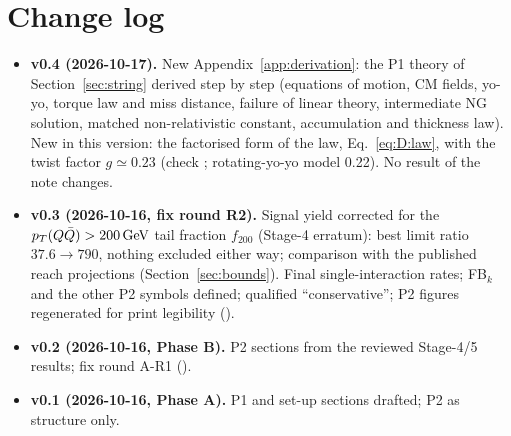 \section*{Change log}
\begin{itemize}
\item \textbf{v0.4 (2026-10-17).} New Appendix~\ref{app:derivation}: the P1 theory of Section~\ref{sec:string}
  derived step by step (equations of motion, CM fields, yo-yo, torque law and miss distance, failure of linear theory,
  intermediate NG solution, matched non-relativistic constant, accumulation and thickness law). New in this version: the
  factorised form of the law, Eq.~\eqref{eq:D:law}, with the twist factor $g\simeq0.23$ (check ;
  rotating-yo-yo model 0.22). No result of the note changes.
\item \textbf{v0.3 (2026-10-16, fix round R2).} Signal yield corrected for the $p_T(Q\bar Q)>200\,\mathrm{GeV}$ tail fraction
  $f_{200}$ (Stage-4 erratum): best limit ratio $37.6\to790$, nothing excluded either way; comparison with the published
  reach projections (Section~\ref{sec:bounds}). Final single-interaction rates; FB$_k$ and the other P2 symbols defined;
  qualified ``conservative''; P2 figures regenerated for print legibility ().
\item \textbf{v0.2 (2026-10-16, Phase B).} P2 sections from the reviewed Stage-4/5 results; fix round A-R1
  ().
\item \textbf{v0.1 (2026-10-16, Phase A).} P1 and set-up sections drafted; P2 as structure only.
\end{itemize}
